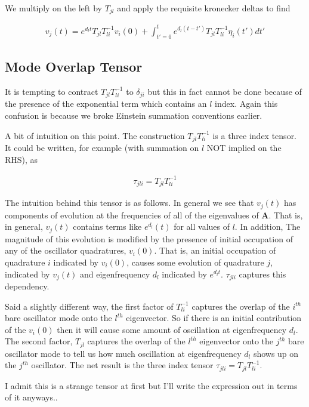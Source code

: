 \documentclass[12pt]{article}
\newcommand{\bv}[1]{\boldsymbol{#1}}
\begin{document}
We multiply on the left by $T_{jl}$ and apply the requisite kronecker deltas to find

\begin{align}
v_j(t) = e^{d_l t} T_{jl}T^{-1}_{li} v_i(0) + \int_{t'=0}^{t} e^{d_l(t-t')}T_{jl}T^{-1}_{li}\eta_i(t')dt'
\end{align}

\subsection{Mode Overlap Tensor}

It is tempting to contract $T_{jl}T^{-1}_{li}$ to $\delta_{ji}$ but this in fact cannot be done because of the presence of the exponential term which contains an $l$ index. Again this confusion is because we broke Einstein summation conventions earlier.

A bit of intuition on this point. The construction $T_{jl}T^{-1}_{li}$ is a three index tensor. It could be written, for example (with summation on $l$ NOT implied on the RHS), as

\begin{align}
\tau_{jli} = T_{jl}T^{-1}_{li}
\end{align}

The intuition behind this tensor is as follows. In general we see that $v_j(t)$ has components of evolution at the frequencies of all of the eigenvalues of $\bv{A}$. That is, in general, $v_j(t)$ contains terms like $e^{d_l}(t)$ for all values of $l$. In addition, The magnitude of this evolution is modified by the presence of initial occupation of any of the oscillator quadratures, $v_i(0)$. That is, an initial occupation of quadrature $i$ indicated by $v_i(0)$, causes some evolution of quadrature $j$, indicated by $v_j(t)$ and eigenfrequency $d_l$ indicated by $e^{d_l t}$. $\tau_{jli}$ captures this dependency.

Said a slightly different way, the first factor of $T^{-1}_{li}$ captures the overlap of the $i^{th}$ bare oscillator mode onto the $l^{th}$ eigenvector. So if there is an initial contribution of the $v_i(0)$ then it will cause some amount of oscillation at eigenfrequency $d_l$. The second factor, $T_{jl}$ captures the overlap of the $l^{th}$ eigenvector onto the $j^{th}$ bare oscillator mode to tell us how much oscillation at eigenfrequency $d_l$ shows up on the $j^{th}$ oscillator. The net result is the three index tensor $\tau_{jli} = T_{jl}T^{-1}_{li}$.

I admit this is a strange tensor at first but I'll write the expression out in terms of it anyways..
\end{document}
